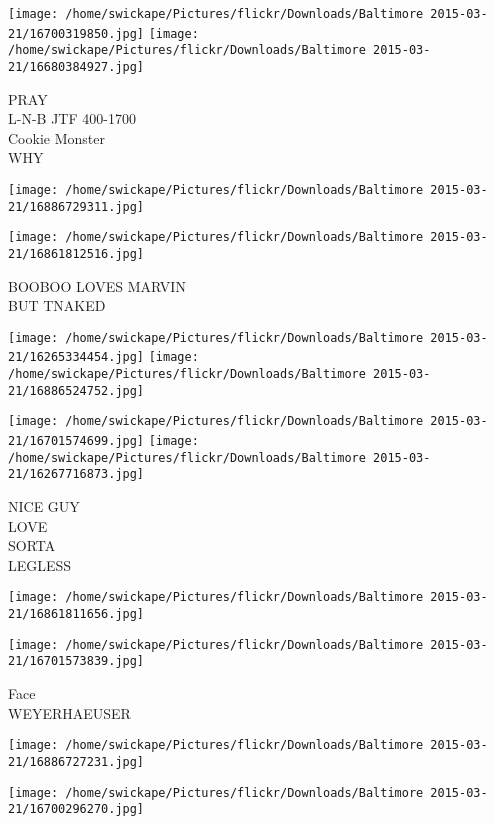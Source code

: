 \documentclass[10pt,letterpaper]{article}
\begin{document}
\texttt{[image: /home/swickape/Pictures/flickr/Downloads/Baltimore 2015-03-21/16700319850.jpg]}
\texttt{[image: /home/swickape/Pictures/flickr/Downloads/Baltimore 2015-03-21/16680384927.jpg]}

PRAY\\
L{-}N{-}B JTF 400{-}1700\\
Cookie Monster\\
WHY\\
\pagebreak

\texttt{[image: /home/swickape/Pictures/flickr/Downloads/Baltimore 2015-03-21/16886729311.jpg]}

\vspace{0.25in}
\texttt{[image: /home/swickape/Pictures/flickr/Downloads/Baltimore 2015-03-21/16861812516.jpg]}

BOOBOO LOVES MARVIN\\
BUT TNAKED\\
\pagebreak

\texttt{[image: /home/swickape/Pictures/flickr/Downloads/Baltimore 2015-03-21/16265334454.jpg]}
\texttt{[image: /home/swickape/Pictures/flickr/Downloads/Baltimore 2015-03-21/16886524752.jpg]}

\texttt{[image: /home/swickape/Pictures/flickr/Downloads/Baltimore 2015-03-21/16701574699.jpg]}
\texttt{[image: /home/swickape/Pictures/flickr/Downloads/Baltimore 2015-03-21/16267716873.jpg]}

NICE GUY\\
LOVE\\
SORTA\\
LEGLESS\\
\pagebreak

\texttt{[image: /home/swickape/Pictures/flickr/Downloads/Baltimore 2015-03-21/16861811656.jpg]}

\vspace{0.25in}
\texttt{[image: /home/swickape/Pictures/flickr/Downloads/Baltimore 2015-03-21/16701573839.jpg]}

Face\\
WEYERHAEUSER\\
\pagebreak

\texttt{[image: /home/swickape/Pictures/flickr/Downloads/Baltimore 2015-03-21/16886727231.jpg]}

\vspace{0.25in}
\texttt{[image: /home/swickape/Pictures/flickr/Downloads/Baltimore 2015-03-21/16700296270.jpg]}
\end{document}
